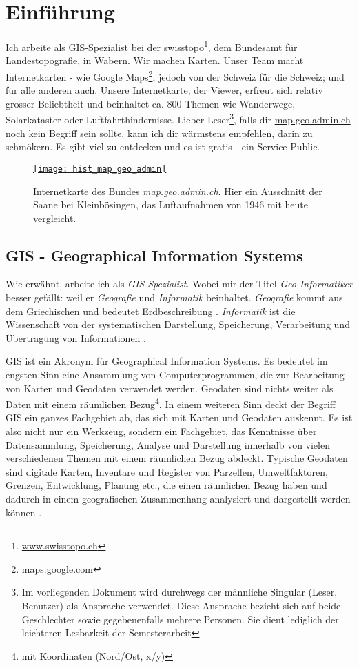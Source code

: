 \section{Einführung}
Ich arbeite als GIS-Spezialist bei der swisstopo\footnote{\href{https://www.swisstopo.ch}{www.swisstopo.ch}}, dem Bundesamt für Landestopografie, in Wabern. Wir machen Karten. Unser Team macht Internetkarten - wie Google Maps\footnote{\href{https://maps.google.com}{maps.google.com}}, jedoch von der Schweiz für die Schweiz; und für alle anderen auch. Unsere Internetkarte, der Viewer, erfreut sich relativ grosser Beliebtheit
und beinhaltet ca. 800 Themen wie Wanderwege, Solarkataster oder Luftfahrthindernisse. Lieber Leser\footnote{Im vorliegenden Dokument wird durchwegs der männliche Singular (Leser, Benutzer) als Ansprache verwendet. Diese Ansprache bezieht sich auf beide Geschlechter sowie gegebenenfalls mehrere Personen. Sie dient lediglich der leichteren Lesbarkeit der Semesterarbeit}, falls dir \href{https://map.geo.admin.ch}{map.geo.admin.ch} noch kein Begriff sein sollte, kann ich dir wärmstens empfehlen, darin zu schmökern. Es gibt viel zu entdecken und es ist gratis - ein Service Public.

\begin{figure}[H]
	\centering
	\href{https://s.geo.admin.ch/8a82499889}{
	\texttt{[image: hist\_map\_geo\_admin]}}
	\caption{Internetkarte des Bundes \emph{\href{https://s.geo.admin.ch/8a82499889}{map.geo.admin.ch}}. Hier ein Ausschnitt der Saane bei Kleinbösingen, das Luftaufnahmen von 1946 mit heute vergleicht.}
	\label{fig:map.geo.admin.ch}
\end{figure}


\subsection{GIS - Geographical Information Systems}
Wie erwähnt, arbeite ich als \emph{GIS-Spezialist}. Wobei mir der Titel \emph{Geo-Informatiker} besser gefällt: weil er \emph{Geografie} und \emph{Informatik} beinhaltet. \emph{Geografie} kommt aus dem Griechischen und bedeutet Erdbeschreibung \autocite[14]{Schertenleib2004}. \emph{Informatik} ist die Wissenschaft von der systematischen Darstellung, Speicherung, Verarbeitung und Übertragung von Informationen \cite{Informatik2010}.

GIS ist ein Akronym für Geographical Information Systems. Es bedeutet im engsten Sinn eine Ansammlung von Computerprogrammen, die zur Bearbeitung von Karten und Geodaten verwendet werden. Geodaten sind nichts weiter als Daten mit einem räumlichen Bezug\footnote{mit Koordinaten (Nord/Ost, x/y)}. In einem weiteren Sinn deckt der Begriff GIS ein ganzes Fachgebiet ab, das sich mit Karten und Geodaten auskennt. Es ist also nicht nur ein Werkzeug, sondern ein Fachgebiet, das Kenntnisse über Datensammlung, Speicherung, Analyse und Darstellung innerhalb von vielen verschiedenen Themen mit einem räumlichen Bezug abdeckt. Typische Geodaten sind digitale Karten, Inventare und Register von Parzellen, Umweltfaktoren, Grenzen, Entwicklung, Planung etc., die einen räumlichen Bezug haben und dadurch in einem geografischen Zusammenhang analysiert und dargestellt werden können \autocite[15]{Balstroem}.

